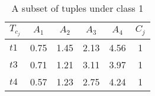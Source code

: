 \begin{table}[!htbp]
\caption{A subset of tuples under class 1}
\label{table:table2_2}
\centering
\begin{tabular}{lccccc}
	\toprule
	\textbf{$\mathit{T_{c_j}}$} & \textbf{$\mathit{A_1}$} & \textbf{$\mathit{A_2}$} & \textbf{$\mathit{A_3}$} & \textbf{$\mathit{A_4}$} & \textbf{$\mathit{C_j}$} \\
	\midrule
	$\mathit{t1}$ & 0.75 & 1.45 & 2.13 & 4.56 & 1 \\
	$\mathit{t3}$ & 0.71 & 1.21 & 3.11 & 3.97 & 1 \\
	$\mathit{t4}$ & 0.57 & 1.23 & 2.75 & 4.24 & 1 \\
	\bottomrule
\end{tabular} 
\end{table}
